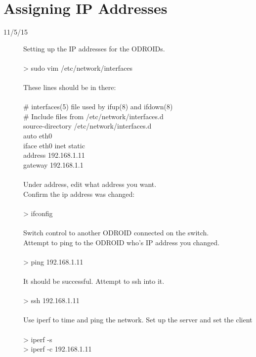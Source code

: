 \section{Assigning IP Addresses}
\begin{description}
\item [11/5/15] Setting up the IP addresses for the ODROIDs. \\ \\
> sudo vim /etc/network/interfaces \\ \\
These lines should be in there: \\ \\
\# interfaces(5) file used by ifup(8) and ifdown(8) \\
\# Include files from /etc/network/interfaces.d \\
source-directory /etc/network/interfaces.d \\
auto eth0 \\
iface eth0 inet static \\
address 192.168.1.11 \\
gateway 192.168.1.1 \\ \\
Under address, edit what address you want.\\
Confirm the ip address was changed: \\ \\
> ifconfig \\ \\
Switch control to another ODROID connected on the switch. \\
Attempt to ping to the ODROID who's IP address you changed. \\ \\
> ping 192.168.1.11 \\ \\
It should be successful. Attempt to ssh into it. \\ \\
> ssh 192.168.1.11 \\ \\
Use iperf to time and ping the network. Set up the server and set the client \\ \\
> iperf -s \\
> iperf -c 192.168.1.11 \\
\end{description}

